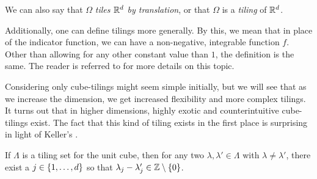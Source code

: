 \documentclass[../thesis.tex]{subfiles}
\begin{document}
\begin{remark}
    We can also say that $\Omega$ \emph{tiles $\mathbb{R}^d$ by translation}, or that $\Omega$ is a \emph{tiling} of $\mathbb{R}^d$. 
\end{remark}
\begin{remark}
    Additionally, one can define tilings more generally. By this, we mean that in place of the indicator function, we can have a non-negative, integrable function $f$. Other than allowing for any other constant value than $1$, the definition is the same. The reader is referred to \cite{kolountzakisTilingsTranslation2010,kolountzakisStructureTilingsLine1996} for more details on this topic.
\end{remark}

Considering only cube-tilings might seem simple initially, but we will see that as we increase the dimension, we get increased flexibility and more complex tilings. It turns out that in higher dimensions, highly exotic and counterintuitive cube-tilings exist. The fact that this kind of tiling exists in the first place is surprising in light of Keller's  \cite{iosevichSpectralTilingProperties1998}.

\begin{theorem}\label{thrm:keller_tiling}
    If $\Lambda$ is a tiling set for the unit cube, then for any two $\lambda, \lambda' \in \Lambda$ with $\lambda\neq\lambda'$, there exist a $j\in \{1,\dots,d\}$ so that $\lambda_j-\lambda_j' \in \mathbb{Z}\setminus\{0\}$.
\end{theorem}
\end{document}
